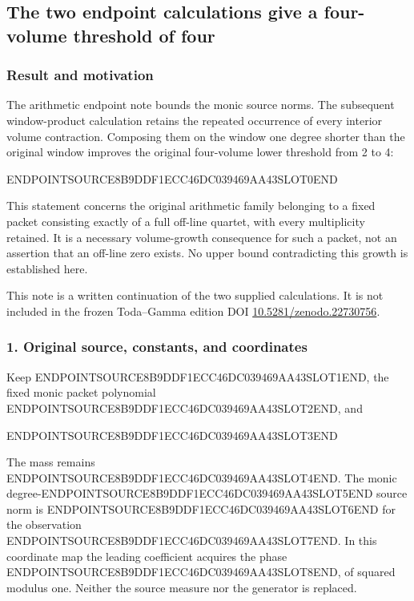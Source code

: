 \subsection{The two endpoint calculations give a four-volume threshold of four}\label{endpoint-four_volume_threshold--the-two-endpoint-calculations-give-a-four-volume-threshold-of-four}

\subsubsection{Result and motivation}\label{endpoint-four_volume_threshold--result-and-motivation}

The arithmetic endpoint note bounds the monic source norms. The subsequent window-product calculation retains the repeated occurrence of every interior volume contraction. Composing them on the window one degree shorter than the original window improves the original four-volume lower threshold from 2 to 4:

ENDPOINTSOURCE8B9DDF1ECC46DC039469AA43SLOT0END

This statement concerns the original arithmetic family belonging to a fixed packet consisting exactly of a full off-line quartet, with every multiplicity retained. It is a necessary volume-growth consequence for such a packet, not an assertion that an off-line zero exists. No upper bound contradicting this growth is established here.

This note is a written continuation of the two supplied calculations. It is not included in the frozen Toda--Gamma edition DOI \href{https://doi.org/10.5281/zenodo.22730756}{10.5281/zenodo.22730756}.

\subsubsection{1. Original source, constants, and coordinates}\label{endpoint-four_volume_threshold--original-source-constants-and-coordinates}

Keep ENDPOINTSOURCE8B9DDF1ECC46DC039469AA43SLOT1END, the fixed monic packet polynomial ENDPOINTSOURCE8B9DDF1ECC46DC039469AA43SLOT2END, and

ENDPOINTSOURCE8B9DDF1ECC46DC039469AA43SLOT3END

The mass remains ENDPOINTSOURCE8B9DDF1ECC46DC039469AA43SLOT4END. The monic degree-ENDPOINTSOURCE8B9DDF1ECC46DC039469AA43SLOT5END source norm is ENDPOINTSOURCE8B9DDF1ECC46DC039469AA43SLOT6END for the observation ENDPOINTSOURCE8B9DDF1ECC46DC039469AA43SLOT7END. In this coordinate map the leading coefficient acquires the phase ENDPOINTSOURCE8B9DDF1ECC46DC039469AA43SLOT8END, of squared modulus one. Neither the source measure nor the generator is replaced.

